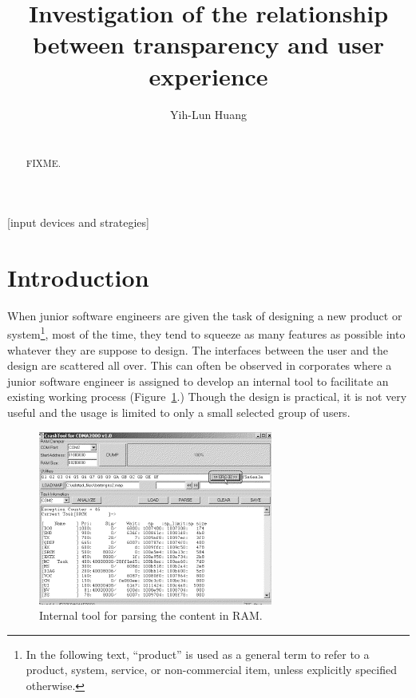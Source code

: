 \documentclass{acm_proc_article-sp}
\begin{document}
\title{Investigation of the relationship between transparency and user
  experience}

\author{
\alignauthor Yih-Lun Huang\\
\\
}

\maketitle
\begin{abstract}
FIXME.
\end{abstract}

[input devices and strategies]



\section{Introduction}
When junior software engineers are given the task of designing a new
product or system\footnote{In the following text, ``product'' is used
  as a general term to refer to a product, system, service, or
  non-commercial item, unless explicitly specified otherwise.}, most
of the time, they tend to squeeze as many features as possible into
whatever they are suppose to design. The interfaces between the user
and the design are scattered all over. This can often be observed in
corporates where a junior software engineer is assigned to develop an
internal tool to facilitate an existing working process
(Figure~\ref{fig:featureful}.)  Though the design is practical, it is
not very useful and the usage is limited to only a small selected
group of users.

\begin{figure}[!t]
\centering
\includegraphics[width=.7\columnwidth]{featureful}
\caption{Internal tool for parsing the content in RAM.}
\label{fig:featureful}
\end{figure}
\end{document}
